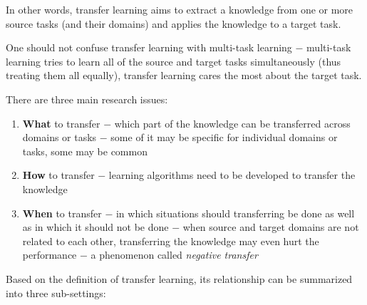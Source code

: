 \documentclass[a4paper,twocolumn]{article}
\begin{document}
In other words, transfer learning aims to extract a knowledge from one or more source tasks (and their domains) and applies the knowledge to a target task.

One should not confuse transfer learning with multi-task learning $-$ multi-task learning tries to learn all of the source and target tasks simultaneously (thus treating them all equally), transfer learning cares the most about the target task.

There are three main research issues:
\begin{enumerate}
    \item \textbf{What} to transfer $-$ which part of the knowledge can be transferred across domains or tasks $-$ some of it may be specific for individual domains or tasks, some may be common
    \item \textbf{How} to transfer $-$ learning algorithms need to be developed to transfer the knowledge
    \item \textbf{When} to transfer $-$ in which situations should transferring be done as well as in which it should not be done $-$ when source and target domains are not related to each other, transferring the knowledge may even hurt the performance $-$ a phenomenon called \textit{negative transfer}
\end{enumerate}

Based on the definition of transfer learning, its relationship can be summarized into three sub-settings:
\end{document}
